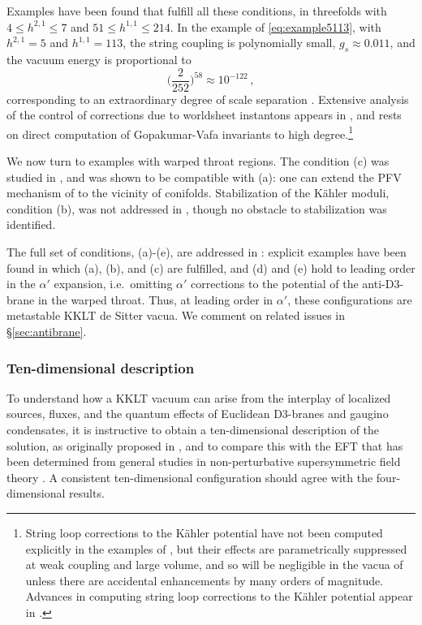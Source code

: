 \documentclass[12pt,a4wide]{article}
\begin{document}
Examples have been found that fulfill all these conditions, in threefolds with $4 \le h^{2,1} \le 7$ and $51 \le h^{1,1} \le 214$.
In the example of \eqref{eq:example5113}, with $h^{2,1}=5$ and $h^{1,1}=113$, the string coupling is polynomially small, $g_s \approx 0.011$, and the vacuum energy is proportional to
\begin{equation}\label{eq:5113}
\biggl(\frac{2}{252}\biggr)^{58} \approx 10^{-122}\,,
\end{equation}
corresponding to an extraordinary degree of scale separation \cite{Demirtas:2021nlu}.  Extensive analysis of the control of corrections due to worldsheet instantons appears in \cite{Demirtas:2021nlu}, and rests on direct computation of Gopakumar-Vafa invariants to high degree.\footnote{String loop corrections to the K\"ahler potential have not been computed explicitly in the examples of 
\cite{Demirtas:2021nlu}, but their effects are parametrically  suppressed 
at weak coupling and large volume, and so will be negligible in the vacua of \cite{Demirtas:2021nlu} unless there are accidental enhancements by many orders of magnitude.  Advances in computing string loop corrections to the K\"ahler potential appear in \cite{Kim:2023eut,Kim:2023sfs}.}

We now turn to examples with warped throat regions.
The condition (c) was studied in \cite{Alvarez-Garcia:2020pxd,Demirtas:2020ffz}, and was shown to be compatible with (a): one can extend the PFV mechanism of \cite{Demirtas:2019sip} to the vicinity of conifolds.  
Stabilization of the K\"ahler moduli, condition (b), was not 
addressed in \cite{Alvarez-Garcia:2020pxd,Demirtas:2020ffz}, though no obstacle to stabilization was identified.

The full set of conditions, (a)-(e), are addressed in \cite{coni}: explicit examples have been found in which (a), (b), and (c) are fulfilled, and (d) and (e) hold to leading order in the $\alpha'$ expansion, i.e.~omitting $\alpha'$ corrections \cite{Hebecker:2022zme,Schreyer:2022len} to the potential of the anti-D3-brane in the warped throat.  
Thus, at leading order in $\alpha'$, these configurations are metastable KKLT de Sitter vacua.
We comment on related issues in
\S\ref{sec:antibrane}.
 
 
\subsubsection{Ten-dimensional description}\label{sec:10dkklt}

To understand how a KKLT vacuum can arise from the interplay of localized sources, fluxes, and the quantum effects of Euclidean D3-branes and gaugino condensates, it is instructive to obtain a ten-dimensional description of the solution, as originally proposed in
\cite{Koerber:2007xk},  and to compare this with the EFT that has been determined from general studies in non-perturbative supersymmetric field theory \cite{Amati:1988ft,Veneziano:1982ah,Affleck:1984xz,Burgess:1995aa}. A consistent ten-dimensional configuration should agree with the four-dimensional results.
\end{document}

